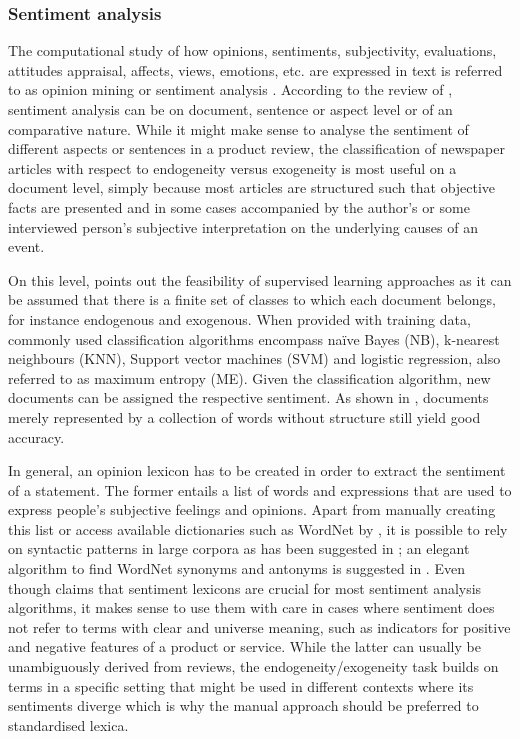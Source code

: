 %
\subsubsection{Sentiment analysis}

The computational study of how opinions, sentiments, subjectivity, evaluations, attitudes appraisal, affects, views, emotions, etc. are expressed in text is referred to as opinion mining or sentiment analysis \parencite{Liu.2012}. According to the review of \textcite{Feldman.2013}, sentiment analysis can be on document, sentence or aspect level or of an comparative nature. While it might make sense to analyse the sentiment of different aspects or sentences in a product review, the classification of newspaper articles with respect to endogeneity versus exogeneity is most useful on a document level, simply because most articles are structured such that objective facts are presented and in some cases accompanied by the author's or some interviewed person's subjective interpretation on the underlying causes of an event. 

On this level, \textcite{Feldman.2013} points out the feasibility of supervised learning approaches as it can be assumed that there is a finite set of classes to which each document belongs, for instance endogenous and exogenous. When provided with training data, commonly used classification algorithms encompass na\"{i}ve Bayes (NB), k-nearest neighbours (KNN), Support vector machines (SVM) and logistic regression, also referred to as maximum entropy (ME). Given the classification algorithm, new documents can be assigned the respective sentiment. As shown in \textcite{Pang.2002}, documents merely represented by a collection of words without structure still yield good accuracy. 

In general, an opinion lexicon has to be created in order to extract the sentiment of a statement. The former entails a list of words and expressions that are used to express people's subjective feelings and opinions. Apart from manually creating this list or access available dictionaries such as WordNet\textsuperscript{\textregistered} by \textcite{Fellbaum.1998,Esuli.2006}, it is possible to rely on syntactic patterns in large corpora as has been suggested in \textcite{Ding.2008,Hatzivassiloglou.1997,Kanayama.2006,Turney.2002,Yu.2003}; an elegant algorithm to find WordNet\textsuperscript{\textregistered} synonyms and antonyms is suggested in \textcite{Kamps.2004}. Even though \textcite{Feldman.2013} claims that sentiment lexicons are crucial for most sentiment analysis algorithms, it makes sense to use them with care in cases where sentiment does not refer to terms with clear and universe meaning, such as indicators for positive and negative features of a product or service. While the latter can usually be unambiguously derived from reviews, the endogeneity/exogeneity task builds on terms in a specific setting that might be used in different contexts where its sentiments diverge which is why the manual approach should be preferred to standardised lexica. 

